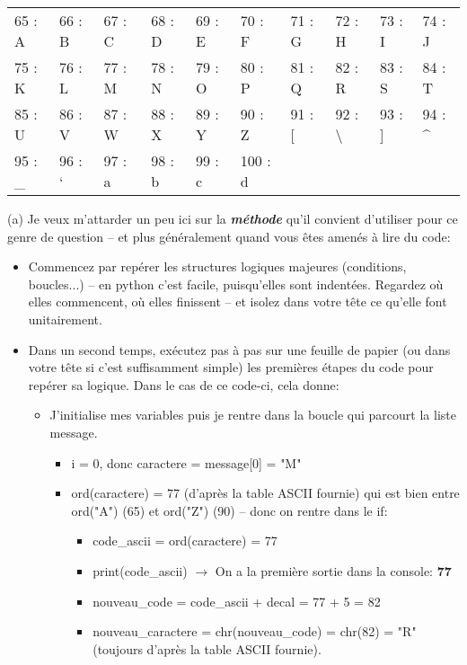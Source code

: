 \documentclass[11pt,a4paper]{exam}
\begin{document}
\begin{questions}
\begin{spacing}{1}
	       	\begin{tabular}{llllllllll}
	       		65 : A & 66 : B & 67 : C & 68 : D & 69 : E & 70 : F & 71 : G & 72 : H & 73 : I & 74 : J \\
	       		75 : K & 76 : L & 77 : M & 78 : N & 79 : O & 80 : P & 81 : Q & 82 : R & 83 : S & 84 : T \\
	       		85 : U & 86 : V & 87 : W & 88 : X & 89 : Y & 90 : Z & 91 : [ & 92 : \textbackslash & 93 : ] & 94 : \textasciicircum \\
	       		95 : \_ & 96 : ` & 97 : a & 98 : b & 99 : c & 100 : d
	       	\end{tabular}
			\begin{solution}
				(a) Je veux m'attarder un peu ici sur la \textit{\textbf{méthode}} qu'il convient d'utiliser pour ce genre de question -- et plus généralement quand vous êtes amenés à lire du code:
				\begin{itemize}
					\item Commencez par repérer les structures logiques majeures (conditions, boucles...) -- en python c'est facile, puisqu'elles sont indentées. Regardez où elles commencent, où elles finissent -- et isolez dans votre tête ce qu'elle font unitairement.
					\item Dans un second temps, exécutez pas à pas sur une feuille de papier (ou dans votre tête si c'est suffisamment simple) les premières étapes du code pour repérer sa logique. Dans le cas de ce code-ci, cela donne:
					\begin{itemize}
						\item J'initialise mes variables puis je rentre dans la boucle qui parcourt la liste message.
						\begin{itemize}
							\item i = 0, donc caractere = message[0] = "M"
							\item ord(caractere) = 77 (d'après la table ASCII fournie) qui est bien entre ord("A") (65) et ord("Z") (90) -- donc on rentre dans le if:
							\begin{itemize}
								\item code\_ascii = ord(caractere) = 77
								\item print(code\_ascii) $\rightarrow$ On a la première sortie dans la console: \textbf{77}
								\item nouveau\_code = code\_ascii + decal = 77 + 5 = 82
								\item nouveau\_caractere = chr(nouveau\_code) = chr(82) = "R" (toujours d'après la table ASCII fournie).

\end{itemize}
\end{itemize}
\end{itemize}
\end{itemize}
\end{solution}
\end{spacing}
\end{questions}
\end{document}
